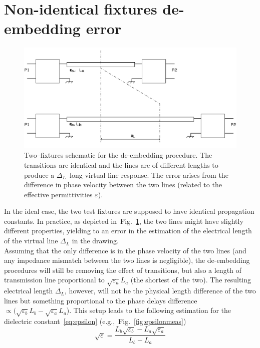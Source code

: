 \documentclass[11pt,a4paper]{article}
\newcommand{\fig}[1]{Fig.~\ref{#1}}
\begin{document}
    \section{Non-identical fixtures de-embedding error}
    \label{sec:error}
    \begin{figure}[!b]
        \includegraphics[width=\textwidth]{error}
        \caption{Two--fixtures schematic for the de-embedding procedure. The transitions are identical and the lines are
        of different lengths to produce a $\Delta_L$--long virtual line response. The error arises from the difference
        in phase velocity between the two lines (related to the effective permittivities $\varepsilon$).}
        \label{fig:error}
    \end{figure}
    In the ideal case, the two test fixtures are supposed to have identical propagation constants.
    In practice, as depicted in~\fig{fig:error}, the two lines might have slightly different properties, yielding
    to an error in the estimation of the electrical length of the virtual line $\Delta_L$ in the drawing.\\
    Assuming that the only difference is in the phase velocity of the two lines (and any impedance mismatch between the
    two lines is negligible), the de-embedding procedures will still be removing the effect of transitions, but also a
    length of transmission line proportional to $\sqrt{\varepsilon_a }L_a$ (the shortest of the two).
    The resulting electrical length $\Delta_L$, however, will not be the physical length difference of the two lines
    but something proportional to the phase delays difference $\propto (\sqrt{\varepsilon_b} L_b - \sqrt{\varepsilon_a} L_a$).
    This setup leads to the following estimation for the dielectric constant~\eqref{eq:epsilon} (e.g.,~\fig{fig:epsilonmeas})
    \begin{equation}
        \sqrt{\varepsilon} = \dfrac{L_b \sqrt{\varepsilon_b} - L_a \sqrt{\varepsilon_a}}{L_b - L_a}
        \label{eq:epsidiff}
    \end{equation}
\end{document}
